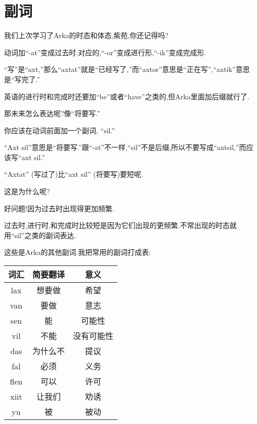 \chapter[副词]{副词}

我们上次学习了Arka的时态和体态,紫苑,你还记得吗?


动词加``-at''变成过去时.对应的,``-or''变成进行形,``-ik''变成完成形.

``写''是``axt,''那么``axtat''就是``已经写了,''而``axtor''意思是``正在写'',``axtik''意思是``写完了.''

英语的进行时和完成时还要加``be''或者``have''之类的,但Arka里面加后缀就行了.

那未来怎么表达呢?像``将要写.''


你应该在动词前面加一个副词, ``sil.''

``Axt sil''意思是``将要写.''跟``-at''不一样,``sil''不是后缀,所以不要写成``axtsil,''而应该写``axt sil.''


``Axtat'' (写过了)比``axt sil'' (将要写)要短呢.

这是为什么呢?


好问题!因为过去时出现得更加频繁.

过去时,进行时,和完成时比较短是因为它们出现的更频繁.不常出现的时态就用``sil''之类的副词表达.

这些是Arka的其他副词.我把常用的副词打成表:
\begin{table}[h!]

    \begin{tabular}{|c|c|c|} %
      \hline
	  \textbf{词汇} & \textbf{简要翻译} & \textbf{意义}\\
      \hline
      lax&  想要做&  希望\\\hline
  	van&  要做&  意志\\\hline
  	sen&  能&  可能性\\\hline
  	vil&  不能&  没有可能性\\\hline
  	das&  为什么不&  提议\\\hline
  	fal&  必须&  义务\\\hline
  	flen&  可以&  许可\\\hline
 	xiit&  让我们&  劝诱\\\hline
  	yu&  被&  被动\\\hline
    \end{tabular}

\end{table}    

